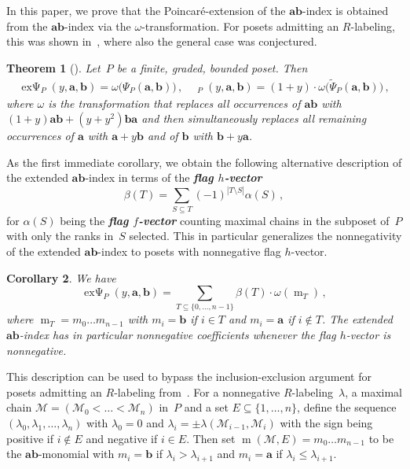 \documentclass[a4paper, english,reqno, 11pt]{amsart}
\theoremstyle{plain}
\newtheorem{theorem}{Theorem}[section]
\newtheorem{corollary}[theorem]{Corollary}
\theoremstyle{definition}
\DeclareMathOperator{\expsi}{ex\Psi}
\DeclareMathOperator{\expsitilde}{ex\widetilde{\Psi}}
\newcommand{\aaa}{\mathbf{a}}
\newcommand{\bbb}{\mathbf{b}}
\newcommand{\Dfn}[1]{\emph{\bfseries #1}}
\begin{document}
\medskip

In this paper, we prove that the Poincaré-extension of the $\aaa\bbb$-index is obtained from the $\aaa\bbb$-index via the $\omega$-transformation.
For posets admitting an $R$-labeling, this was shown in~\cite[Corollary~2.9]{poincareextended}, where also the general case was conjectured.

\begin{theorem}[{\cite[Conjecture~2.10]{poincareextended}}]
\label{thm: exPsi is omega Psi}
    Let~$P$ be a finite, graded, bounded poset.
    Then
     \begin{align*}
        \expsi_P(y,\aaa,\bbb)      = \omega\big(\Psi_P(\aaa,\bbb)\big)\,, \quad
        \expsitilde_P(y,\aaa,\bbb) = (1+y) \cdot \omega\big(\widetilde\Psi_P(\aaa,\bbb)\big)\,,
    \end{align*}
    where $\omega$ is the transformation that replaces all occurrences of $\aaa\bbb$ with $(1+y)\aaa\bbb + (y+y^2)\bbb\aaa$ and then simultaneously replaces all remaining occurrences of $\aaa$ with $\aaa+y\bbb$ and of $\bbb$ with $\bbb+y\aaa$.
\end{theorem}

As the first immediate corollary, we obtain the following alternative description of the extended $\aaa\bbb$-index in terms of the \Dfn{flag $h$-vector}
\[
    \beta(T) = \sum_{S \subseteq T} (-1)^{|T \setminus S|} \alpha(S)\,,
\]
for $\alpha(S)$ being the \Dfn{flag $f$-vector} counting maximal chains in the subposet of~$P$ with only the ranks in~$S$ selected.
This in particular generalizes the nonnegativity of the extended $\aaa\bbb$-index to posets with nonnegative flag $h$-vector.

\begin{corollary}
\label{cor:expsiviabeta}
    We have
    \[
        \expsi_P (y,\aaa,\bbb) = \sum_{T \subseteq \{0,\dots,n-1\}} \beta(T) \cdot \omega(\operatorname{m}_T)\,,
    \]
    where $\operatorname{m}_T = m_0 \dots m_{n-1}$ with $m_i = \bbb$ if $i \in T$ and $m_i = \aaa$ if $i \notin T$.
    The extended $\aaa\bbb$-index has in particular nonnegative coefficients whenever the flag $h$-vector is nonnegative.
\end{corollary}

This description can be used to bypass the inclusion-exclusion argument for posets admitting an $R$-labeling from~\cite[Section~4]{poincareextended}.
For a nonnegative $R$-labeling~$\lambda$, a maximal chain $\mathcal M = (\mathcal M_0<\dots<\mathcal M_n)$ in~$P$ and a set $E \subseteq \{1,\dots,n\}$, define the sequence $(\lambda_0,\lambda_1,\dots,\lambda_n)$ with $\lambda_0 = 0$ and $\lambda_i = \pm \lambda(\mathcal M_{i-1},\mathcal M_i)$ with the sign being positive if $i \not \in E$ and negative if $i \in E$.
Then set $\operatorname{m}(\mathcal M,E) = m_0\dots m_{n-1}$ to be the $\aaa\bbb$-monomial with $m_i = \bbb$ if $\lambda_{i} > \lambda_{i+1}$ and $m_i = \aaa$ if $\lambda_i \leq \lambda_{i+1}$.
\end{document}

